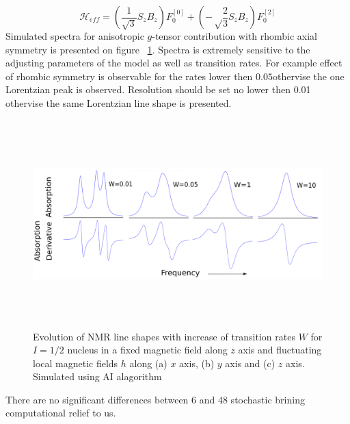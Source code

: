 \begin{equation}
\mathcal{H}_{eff}=(\frac{1}{\sqrt{3}}S_zB_z)F_0^{[0]}+(-\sqrt\frac{2}{3}S_zB_z)F_0^{[2]}
\end{equation}
Simulated spectra for anisotropic $g$-tensor contribution with rhombic axial symmetry is presented on figure ~\ref{figure:gten1}. Spectra is extremely sensitive to the adjusting parameters of the model as well as transition rates. For example effect of rhombic symmetry is observable for the rates lower then $0.05$othervise the one Lorentzian peak is observed. Resolution should be set no lower then 0.01 othervise the same Lorentzian line shape is presented. 
\begin{figure}[h!]
\centering
\includegraphics[height=8cm,width=1\textwidth]{figures/chap2/gtenanisat1.png}
\caption{Evolution of NMR line shapes with increase of transition rates $W$ for $I=1/2$ nucleus in a fixed magnetic field along $z$ axis and fluctuating local magnetic fields $h$ along (a) $x$ axis, (b) $y$ axis and (c) $z$ axis. Simulated using AI alagorithm}
\label{figure:gten1}
\end{figure}
There are no significant differences between 6 and 48 stochastic brining computational relief to us. 
